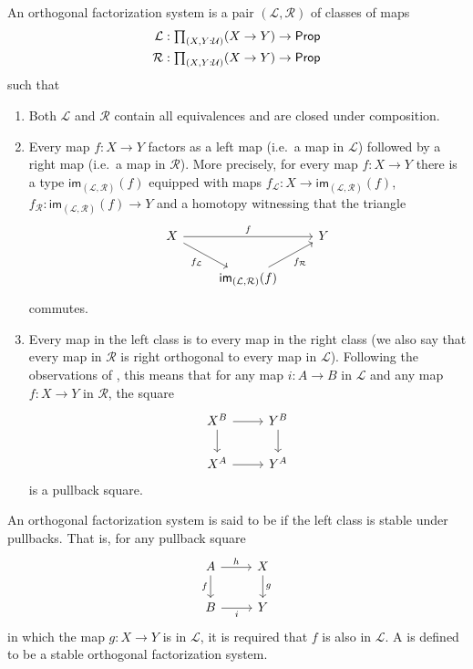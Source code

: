 \documentclass[9pt,twosided]{amsart}
\begin{document}
\begin{defn}
  An orthogonal factorization system is a pair $(\mathcal{L},\mathcal{R})$ of classes of maps
  \begin{align*}
    \mathcal{L} & : \prd{X,Y:\UU} (X \to Y) \to \mathsf{Prop} \\
    \mathcal{R} & : \prd{X,Y:\UU} (X \to Y) \to \mathsf{Prop} 
  \end{align*}
  such that
  \begin{enumerate}
  \item Both $\mathcal{L}$ and $\mathcal{R}$ contain all equivalences and are closed under composition.
  \item Every map $f:X\to Y$ factors as a left map (i.e.~a map in $\mathcal{L}$) followed by a right map (i.e.~a map in $\mathcal{R}$). More precisely, for every map $f:X\to Y$ there is a type $\mathsf{im}_{(\mathcal{L},\mathcal{R})}(f)$ equipped with maps $f_{\mathcal{L}}:X\to \mathsf{im}_{(\mathcal{L},\mathcal{R})}(f)$, $f_{\mathcal{R}}:\mathsf{im}_{(\mathcal{L},\mathcal{R})}(f) \to Y$ and a homotopy witnessing that the triangle
    \begin{equation*}
      \begin{tikzcd}
        X \arrow[rr,"f"] \arrow[dr,swap,"f_{\mathcal{L}}"] & & Y \\
        & \mathsf{im}_{(\mathcal{L},\mathcal{R})}(f) \arrow[ur,swap,"f_{\mathcal{R}}"]
      \end{tikzcd}
    \end{equation*}
    commutes.
  \item Every map in the left class is  to every map in the right class (we also say that every map in $\mathcal{R}$ is right orthogonal to every map in $\mathcal{L}$). Following the observations of \cite{AnelBiedermanFinsterJoyal}, this means that for any map $i:A \to B$ in $\mathcal{L}$ and any map $f:X \to Y$ in $\mathcal{R}$, the square
    \begin{equation*}
      \begin{tikzcd}
        X^B \arrow[r] \arrow[d] & Y^B \arrow[d] \\
        X^A \arrow[r] & Y^A
      \end{tikzcd}
    \end{equation*}
    is a pullback square.
  \end{enumerate}
  An orthogonal factorization system is said to be  if the left class is stable under pullbacks. That is, for any pullback square
    \begin{equation*}
      \begin{tikzcd}
        A \arrow[r,"h"] \arrow[d,swap,"f"] & X \arrow[d,"g"] \\
        B \arrow[r,swap,"i"] & Y
      \end{tikzcd}
    \end{equation*}
    in which the map $g:X \to Y$ is in $\mathcal{L}$, it is required that $f$ is also in $\mathcal{L}$. A  is defined to be a stable orthogonal factorization system.
\end{defn}
\end{document}
